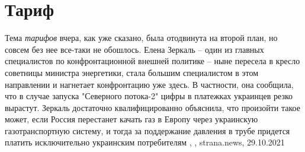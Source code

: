  
 
 
 
 
\chapter{Тариф}

Тема \emph{тарифов} вчера, как уже сказано, была отодвинута на второй план, но
совсем без нее все-таки не обошлось. Елена Зеркаль – один из главных
специалистов по конфронтационной внешней политике – ныне пересела в кресло
советницы министра энергетики, стала большим специалистом в этом направлении и
нагнетает конфронтацию уже здесь. В частности, она сообщила, что в случае
запуска "Северного потока-2" цифры в платежках украинцев резко вырастут.
Зеркаль достаточно квалифицированно объяснила, что произойти такое может, если
Россия перестанет качать газ в Европу через украинскую газотранспортную
систему, и тогда за поддержание давления в трубе придется платить исключительно
украинским потребителям
, 
, strana.news, 29.10.2021
